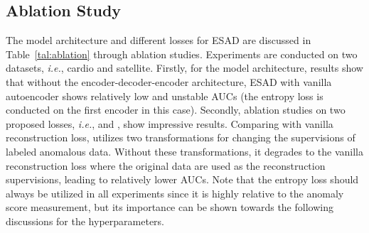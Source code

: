 \documentclass{bmvc2k}
\begin{document}
\renewcommand \arraystretch{0.75}
\begin{table}[t]
\centering
\caption{Ablation study on shallow and deep networks, for both the encoder and the decoder. `Shallow' is a LeNet-type network utilized in~\cite{SAD}. `Deep' is the network utilized in ESAD. We report the avg. AUC in \% with st. dev. computed over 90 experiments at various  on F-MNIST. Results with * are lower than expected because of the model collapse problem for Deep SAD under the small labeled anomalies ratio.}
\label{tal:backbone}
\footnotesize
{}
\vspace{-5pt}
\end{table}

\subsection{Ablation Study}\label{sec45}
The model architecture and different losses for ESAD are discussed in Table~\ref{tal:ablation} through ablation studies. Experiments are conducted on two datasets, \emph{i.e.}, cardio and satellite. Firstly, for the model architecture, results show that without the encoder-decoder-encoder architecture, ESAD with vanilla autoencoder shows relatively low and unstable AUCs (the entropy loss is conducted on the first encoder in this case). Secondly, ablation studies on two proposed losses, \emph{i.e.},  and , show impressive results. Comparing with vanilla reconstruction loss,  utilizes two transformations for changing the supervisions of labeled anomalous data. Without these transformations, it degrades to the vanilla reconstruction loss where the original data are used as the reconstruction supervisions, leading to relatively lower AUCs. Note that the entropy loss should always be utilized in all experiments since it is highly relative to the anomaly score measurement, but its importance can be shown towards the following discussions for the hyperparameters. 
\end{document}

